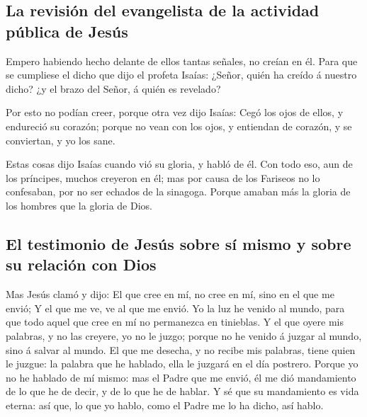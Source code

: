 \hypertarget{la-revisiuxf3n-del-evangelista-de-la-actividad-puxfablica-de-jesuxfas}{%
\subsection{La revisión del evangelista de la actividad pública de
Jesús}\label{la-revisiuxf3n-del-evangelista-de-la-actividad-puxfablica-de-jesuxfas}}

 Empero habiendo hecho delante de ellos tantas señales, no
creían en él.  Para que se cumpliese el dicho que dijo el
profeta Isaías: ¿Señor, quién ha creído á nuestro dicho? ¿y el brazo del
Señor, á quién es revelado?

 Por esto no podían creer, porque otra vez dijo Isaías:
 Cegó los ojos de ellos, y endureció su corazón; porque no
vean con los ojos, y entiendan de corazón, y se conviertan, y yo los
sane.

 Estas cosas dijo Isaías cuando vió su gloria, y habló de
él.  Con todo eso, aun de los príncipes, muchos creyeron en
él; mas por causa de los Fariseos no lo confesaban, por no ser echados
de la sinagoga.  Porque amaban más la gloria de los hombres
que la gloria de Dios.

\hypertarget{el-testimonio-de-jesuxfas-sobre-suxed-mismo-y-sobre-su-relaciuxf3n-con-dios}{%
\subsection{El testimonio de Jesús sobre sí mismo y sobre su relación
con
Dios}\label{el-testimonio-de-jesuxfas-sobre-suxed-mismo-y-sobre-su-relaciuxf3n-con-dios}}

 Mas Jesús clamó y dijo: El que cree en mí, no cree en mí,
sino en el que me envió;  Y el que me ve, ve al que me
envió.  Yo la luz he venido al mundo, para que todo aquel
que cree en mí no permanezca en tinieblas.  Y el que oyere
mis palabras, y no las creyere, yo no le juzgo; porque no he venido á
juzgar al mundo, sino á salvar al mundo.  El que me
desecha, y no recibe mis palabras, tiene quien le juzgue: la palabra que
he hablado, ella le juzgará en el día postrero.  Porque yo
no he hablado de mí mismo: mas el Padre que me envió, él me dió
mandamiento de lo que he de decir, y de lo que he de hablar.
 Y sé que su mandamiento es vida eterna: así que, lo que yo
hablo, como el Padre me lo ha dicho, así hablo.

